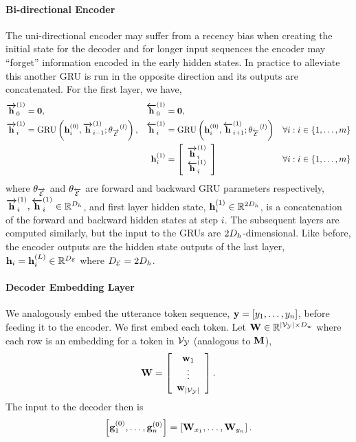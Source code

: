 \paragraph{Bi-directional Encoder}
The uni-directional encoder may suffer from a recency bias when creating the initial state for the 
decoder and for longer input sequences the encoder may ``forget'' information encoded in the 
early hidden states. In practice to alleviate this another GRU is run in the opposite direction and
its outputs are concatenated. For the first layer, we have,
\begin{align*}
    {\boldsymbol{\overrightarrow{\mathbf{h}}}}_0^{(1)} & = \mathbf{0}, & {\boldsymbol{\overleftarrow{\mathbf{h}}}}_0^{(1)} &= \mathbf{0}, & \\
    {\boldsymbol{\overrightarrow{\mathbf{h}}}}_i^{(1)} & =\operatorname{GRU}\left(\mathbf{h}_i^{(0)}, {\boldsymbol{\overrightarrow{\mathbf{h}}}}_{i-1}^{(1)}; {\theta_{\overrightarrow{\mathcal{E}}}}^{(l)}\right), & {\boldsymbol{\overleftarrow{\mathbf{h}}}}_i^{(1)} & =\operatorname{GRU}\left(\mathbf{h}_i^{(0)}, {\boldsymbol{\overleftarrow{\mathbf{h}}}}_{i+1}^{(1)}; {\theta_{\overleftarrow{\mathcal{E}}}}^{(l)}\right)    & \forall i : i \in \{1,\ldots, m\}\\
 & & \mathbf{h}^{(1)}_i & = \left[\begin{array}{c} {\boldsymbol{\overrightarrow{\mathbf{h}}}}_i^{(1)} \\ {\boldsymbol{\overleftarrow{\mathbf{h}}}}_i^{(1)} \end{array}\right]
& \forall i : i \in \{1,\ldots, m\}\\
\end{align*}
where ${\theta_{\overrightarrow{\mathcal{E}}}}$ and ${\theta_{\overleftarrow{\mathcal{E}}}}$ are forward and backward GRU parameters respectively,
${\boldsymbol{\overrightarrow{\mathbf{h}}}}^{(1)}_i,{\boldsymbol{\overleftarrow{\mathbf{h}}}}^{(1)}_i\in\mathbb{R}^{D_{h}}$, and first layer hidden state,
$\mathbf{h}^{(1)}_i\in\mathbb{R}^{2D_{h}}$, is a concatenation of the forward and backward hidden
states at step $i$. 
The subsequent layers are computed similarly, but the input to the GRUs are $2D_{h}$-dimensional.
Like before, the encoder outputs are the hidden state outputs of the last layer, $\mathbf{h}_i = \mathbf{h}_i^{(L)} \in \mathbb{R}^{{D_\mathcal{E}}}$ where ${D_\mathcal{E}} = 2D_{h}$.


\paragraph{Decoder Embedding Layer}
We analogously embed the utterance token sequence, 
$\mathbf{y} = \left[ y_1,\ldots,y_n\right]$,
before feeding it to the encoder. 
We first embed each token. Let $\mathbf{W} \in \mathbb{R}^{{\left\vert \mathcal{V}_{\mathcal{Y}} \right\vert} \times D_{w}}$ where each row is an embedding for a token in $\mathcal{V}_{\mathcal{Y}}$ (analogous to $\mathbf{M}$),
\[ \mathbf{W} = \left[ \begin{array}{c} \mathbf{w}_1\\ \vdots \\ \mathbf{w}_{\left\vert \mathcal{V}_{\mathcal{Y}} \right\vert} \end{array}\right]. \]
The input to the decoder then is 
\[\left[\mathbf{g}^{(0)}_1,\ldots,\mathbf{g}^{(0)}_n\right] = \left[\mathbf{W}_{x_1},\ldots,
                                                                            \mathbf{W}_{y_n}\right]. \]

